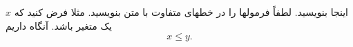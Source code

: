 \documentclass[12pt,a4paper]{article}
\theoremstyle{defninition}
\begin{document}
اینجا بنویسید. لطفاً فرمولها را در خطهای متفاوت با متن بنویسید. مثلا فرض کنید که
$x$
یک متغیر باشد. آنگاه داریم
\[x \leq y.\]
\end{document}
